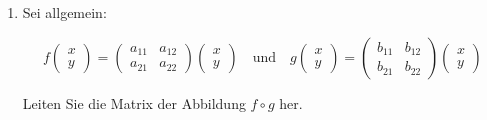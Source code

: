 \begin{LA}
\begin{enumerate}
        Bestimmen Sie für die folgenden Funktionen die Bilder der Vektoren \( \vec{e}_1 = \begin{pmatrix} 1 \\ 0 \end{pmatrix} \) und \( \vec{e}_2 = \begin{pmatrix} 0 \\ 1 \end{pmatrix} \). Wie lautet dann die Matrix-Gleichung der Abbildung?
        \vspace{1cm}
        \begin{enumerate}
            \item \( (f+g)(\vec{e}_1) = \) \hfill \( (f+g)(\vec{e}_2) = \) \hfill Matrix von \( f+g \): \hfill
            \vspace{3cm}
            \item \( (f-g)(\vec{e}_1) = \) \hfill \( (f-g)(\vec{e}_2) = \) \hfill Matrix von \( f-g \):\hfill
            \vspace{3cm}
            
            \item \( (3 \cdot f)(\vec{e}_1) = \) \hfill \( (3 \cdot f)(\vec{e}_2) = \) \hfill Matrix von \( 3 \cdot f \):\hfill
            \vspace{3cm}
            \item \( (f \circ g)(\vec{e}_1) = \) \hfill \( (f \circ g)(\vec{e}_2) = \) \hfill Matrix von \( f \circ g \):\hfill
            \vspace{3cm}
            \item \( (g \circ f)(\vec{e}_1) = \) \hfill \( (g \circ f)(\vec{e}_2) = \) \hfill Matrix von \( g \circ f \):\hfill
            \vspace{3cm}
        \end{enumerate}
        
        \item Sei allgemein:

\[
f \begin{pmatrix} x \\ y \end{pmatrix} = 
\begin{pmatrix} a_{11} & a_{12} \\ a_{21} & a_{22} \end{pmatrix} 
\begin{pmatrix} x \\ y \end{pmatrix}
\quad \text{und} \quad
g \begin{pmatrix} x \\ y \end{pmatrix} = 
\begin{pmatrix} b_{11} & b_{12} \\ b_{21} & b_{22} \end{pmatrix} 
\begin{pmatrix} x \\ y \end{pmatrix}
\]

Leiten Sie die Matrix der Abbildung \( f \circ g \) her.
    \end{enumerate}
\end{LA}

